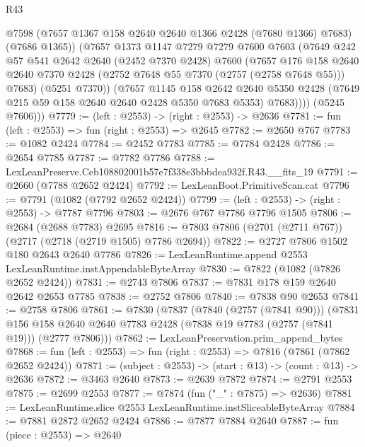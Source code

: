 \begin{lexlean}{R43}
\begin{coremodule}
              @7598
              (@7657 @1367 @158 @2640 @2640 @1366 @2428 (@7680 @1366) @7683)
              (@7686 @1365))
            (@7657
              @1373
              @1147
              @7279
              @7279
              @7600
              @7603
              (@7649
                @242
                @57
                @541
                @2642
                @2640
                (@2452 @7370 @2428)
                @7600
                (@7657
                  @176
                  @158
                  @2640
                  @2640
                  @7370
                  @2428
                  (@2752 @7648 @55 @7370 (@2757 (@2758 @7648 @55)))
                  @7683)
                (@5251 @7370))
              (@7657
                @1145
                @158
                @2642
                @2640
                @5350
                @2428
                (@7649 @215 @59 @158 @2640 @2640 @2428 @5350 @7683 @5353)
                @7683))))
        (@5245 @7606)))
@7779 := (left : @2553) -> (right : @2553) -> @2636
@7781 := fun (left : @2553) => fun (right : @2553) => @2645
@7782 := @2650 @767
@7783 := @1082 @2424
@7784 := @2452 @7783
@7785 := @7784 @2428
@7786 := @2654 @7785
@7787 := @7782 @7786
@7788 := LexLeanPreserve.Ceb108802001b57e7f338e3bbbdea932f.R43.__fits_19
@7791 := @2660 (@7788 @2652 @2424)
@7792 := LexLeanBoot.PrimitiveScan.cat
@7796 := @7791 (@1082 (@7792 @2652 @2424))
@7799 := (left : @2553) -> (right : @2553) -> @7787 @7796
@7803 := @2676 @767 @7786 @7796 @1505
@7806 := @2684 (@2688 @7783) @2695
@7816 := @7803 @7806 (@2701 (@2711 @767)) (@2717 (@2718 (@2719 @1505) @7786 @2694))
@7822 := @2727 @7806 @1502 @180 @2643 @2640 @7786
@7826 := LexLeanRuntime.append @2553 LexLeanRuntime.instAppendableByteArray
@7830 := @7822 (@1082 (@7826 @2652 @2424))
@7831 := @2743 @7806
@7837 := @7831 @178 @159 @2640 @2642 @2653 @7785
@7838 := @2752 @7806
@7840 := @7838 @90 @2653
@7841 := @2758 @7806
@7861 := @7830
    (@7837
      (@7840 (@2757 (@7841 @90)))
      (@7831 @156 @158 @2640 @2640 @7783 @2428 (@7838 @19 @7783 (@2757 (@7841 @19))) (@2777 @7806)))
@7862 := LexLeanPreservation.prim_append_bytes
@7868 := fun (left : @2553) => fun (right : @2553) => @7816 (@7861 (@7862 @2652 @2424))
@7871 := (subject : @2553) -> (start : @13) -> (count : @13) -> @2636
@7872 := @3463 @2640
@7873 := @2639 @7872
@7874 := @2791 @2553
@7875 := @2699 @2553
@7877 := @7874 (fun ("_" : @7875) => @2636)
@7881 := LexLeanRuntime.slice @2553 LexLeanRuntime.instSliceableByteArray
@7884 := @7881 @2872 @2652 @2424
@7886 := @7877 @7884 @2640
@7887 := fun (piece : @2553) => @2640

\end{coremodule}
\end{lexlean}

